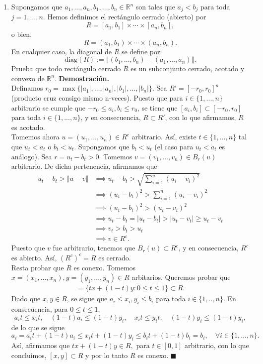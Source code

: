 \documentclass[12pt]{article}
\newcommand{\abs}[1]{\left\vert#1\right\vert}
\newcommand{\norm}[1]{\left\Vert#1\right\Vert}
\newcommand{\diag}{\mathrm{diag}}
\newcommand{\R}{\mathbb R}
\begin{document}
\begin{enumerate}
\item Supongamos que $a_1,\ldots,a_n,b_1,\ldots,b_n\in \R^n$ son tales que $a_j<b_j$ para toda $j=1,\ldots,n$. Hemos definimos el rectángulo cerrado (abierto) por
\[ R = [a_1,b_1]\times \cdots\times [a_n,b_n], \]
o bien,
\[ R = (a_1,b_1)\times \cdots\times (a_n,b_n). \]
En cualquier caso, la \textsf{diagonal} de $R$ se define por:
\[ \diag(R) := \norm{(b_1,\ldots,b_n) - (a_1,\ldots,a_n)}. \]
Prueba que todo rectángulo cerrado $R$ es un subconjunto cerrado, acotado y convexo de $\R^n$. 
\textbf{Demostración.} \\ 
Definamos $r_0=\max\{\abs{a_1},\ldots,\abs{a_n},\abs{b_1},\ldots,\abs{b_n}\}$. Sea $R'=[-r_0,r_0]^n$ (producto cruz consigo mismo n-veces). Puesto que
para $i\in \{1,...,n\}$ arbitrario se cumple que $-r_0\leq a_i,b_i \leq r_0$, se tiene que $[a_i,b_i]\subset [-r_0,r_0]$ para toda $i \in \{1,...,n\}$, y en consecuencia,
$R\subset R'$, con lo que afirmamos, $R$ es acotado. \\ Tomemos ahora $u=(u_1,...,u_n) \in R^c$ arbitrario. Así, existe $t \in \{1,...,n\}$ tal que $u_t<a_t$ o $b_t<u_t$. Supongamos que $b_t<u_t$ (el
caso para $u_t<a_t$ es análogo). Sea $r=u_t-b_t>0$. Tomemos $v=(v_1,...,v_n) \in B_r(u)$ arbitrario. De dicha pertenencia, afirmamos que
\begin{align*}
    u_t-b_t > \norm{u-v} &\implies u_t-b_t > \sqrt{\sum_{i=1}^{n}(u_i-v_i)^2} \\
    &\implies  (u_t-b_t)^2 > \sum_{i=1}^{n}(u_i-v_i)^2 \\
    &\implies (u_t-b_t)^2 > (u_t-v_t)^2 \\
    &\implies u_t-b_t=\abs{u_t-b_t} > \abs{u_t-v_t} \geq u_t-v_t \\
    &\implies v_t > b_t > u_t \\
    &\implies v \in R^c.
\end{align*}
Puesto que $v$ fue arbitrario, tenemos que $B_r(u)\subset R^c$, y en consecuencia, $R^c$ es abierto. Así, $(R^c)^c=R$ es cerrado. \\ Resta probar que $R$ es conexo. Tomemos $x=(x_1,...,x_n),y=(y_1,...,y_n)\in R$
arbitarios. Queremos probar que
\begin{align*}
    [x,y]=\{tx+(1-t)y:0\leq t \leq 1\}\subset R.
\end{align*}
Dado que $x,y\in R$, se sigue que $a_i\leq x_i,y_i \leq b_i$ para toda $i \in \{1,..,n\}$. En consecuencia, para $0\leq t \leq 1$,
\[
a_it\leq x_it,\quad (1-t)a_i\leq (1-t)y_i, \quad x_it\leq y_it, \quad (1-t)y_i \leq (1-t)y_i,
\]
de lo que se sigue
\[
a_i=a_it+(1-t)a_i \leq x_it+(1-t)y_i \leq b_it + (1-t)b_i = b_i, \quad \forall i\in \{1,...,n\}.
\]
Así, afirmamos que $tx+(1-t)y \in R,$ para $t\in [0,1]$ arbitrario, con lo que concluimos, $[x,y]\subset R$ y por lo tanto $R$ es conexo. $\blacksquare$
\end{enumerate}
\end{document}
